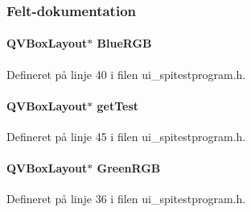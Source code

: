\subsubsection{Felt-\/dokumentation}
\paragraph[{\texorpdfstring{Blue\+R\+GB}{BlueRGB}}]{\setlength{\rightskip}{0pt plus 5cm}Q\+V\+Box\+Layout$\ast$ Blue\+R\+GB\hspace{0.3cm}{\ttfamily [inherited]}}\hypertarget{class_ui___spi_test_program_ac0ff6df3d4236129efdc0762eed715f4}{}\label{class_ui___spi_test_program_ac0ff6df3d4236129efdc0762eed715f4}


Defineret på linje 40 i filen ui\+\_\+spitestprogram.\+h.

\paragraph[{\texorpdfstring{get\+Test}{getTest}}]{\setlength{\rightskip}{0pt plus 5cm}Q\+V\+Box\+Layout$\ast$ get\+Test\hspace{0.3cm}{\ttfamily [inherited]}}\hypertarget{class_ui___spi_test_program_a6d63969ee767e7e499a5c6abd4424553}{}\label{class_ui___spi_test_program_a6d63969ee767e7e499a5c6abd4424553}


Defineret på linje 45 i filen ui\+\_\+spitestprogram.\+h.

\paragraph[{\texorpdfstring{Green\+R\+GB}{GreenRGB}}]{\setlength{\rightskip}{0pt plus 5cm}Q\+V\+Box\+Layout$\ast$ Green\+R\+GB\hspace{0.3cm}{\ttfamily [inherited]}}\hypertarget{class_ui___spi_test_program_a45540b28778c355f4e372566eb065ef3}{}\label{class_ui___spi_test_program_a45540b28778c355f4e372566eb065ef3}


Defineret på linje 36 i filen ui\+\_\+spitestprogram.\+h.

